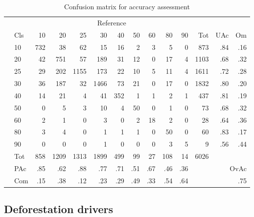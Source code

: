 	    \begin{table}[ht]
		    \centering
		    \caption[Accuracy assessment]{Confusion matrix for accuracy assessment}
		    \label{tab:accuracy}
		    \begin{tabular}{ll|rrrrrrrrr|rrr}
			    & & \multicolumn{9}{c|}{Reference} & & & \\
			    & Cls & 10 & 20 & 25 & 30 & 40 & 50 & 60 & 80 & 90 & Tot & UAc & Om \\\hline
			    \multirow{9}{*}{\STAB{\rotatebox[origin=c]{90}{Prediction}}}
			    & 10 & 732 & 38 & 62 & 15 & 16 & 2 & 3 & 5 & 0 & 873 & .84 & .16 \\ 
			    & 20 & 42 & 751 & 57 & 189 & 31 & 12 & 0 & 17 & 4 & 1103 & .68 & .32 \\ 
			    & 25 & 29 & 202 & 1155 & 173 & 22 & 10 & 5 & 11 & 4 & 1611 & .72 & .28 \\ 
			    & 30 & 36 & 187 & 32 & 1466 & 73 & 21 & 0 & 17 & 0 & 1832 & .80 & .20 \\ 
			    & 40 & 14 & 21 & 4 & 41 & 352 & 1 & 1 & 2 & 1 & 437 & .81 & .19 \\ 
			    & 50 & 0 & 5 & 3 & 10 & 4 & 50 & 0 & 1 & 0 & 73 & .68 & .32 \\ 
			    & 60 & 2 & 1 & 0 & 3 & 0 & 2 & 18 & 2 & 0 & 28 & .64 & .36 \\ 
			    & 80 & 3 & 4 & 0 & 1 & 1 & 1 & 0 & 50 & 0 & 60 & .83 & .17 \\ 
			    & 90 & 0 & 0 & 0 & 1 & 0 & 0 & 0 & 3 & 5 & 9 & .56 & .44 \\\hline 
			    & Tot & 858 & 1209 & 1313 & 1899 & 499 & 99 & 27 & 108 & 14 & 6026 & & \\
			    & PAc & .85 & .62 & .88 & .77 & .71 & .51 & .67 & .46 & .36 & & \multicolumn{2}{r}{OvAc} \\
			    & Com & .15 & .38 & .12 & .23 & .29 & .49 & .33 & .54 & .64 & & \multicolumn{2}{r}{.75} \\ 
		    \end{tabular}
	    \end{table}

\newpage

    \subsection{Deforestation drivers}
    \label{subsec:driver}
    

